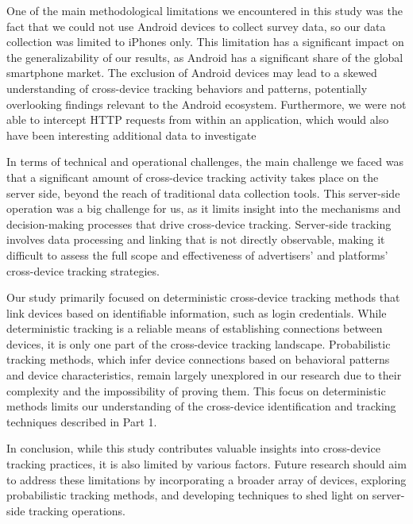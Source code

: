One of the main methodological limitations we encountered in this study was the fact that we could not use Android devices to collect survey data, so our data collection was limited to iPhones only. This limitation has a significant impact on the generalizability of our results, as Android has a significant share of the global smartphone market. The exclusion of Android devices may lead to a skewed understanding of cross-device tracking behaviors and patterns, potentially overlooking findings relevant to the Android ecosystem. Furthermore, we were not able to intercept HTTP requests from within an application, which would also have been interesting additional data to investigate

In terms of technical and operational challenges, the main challenge we faced was that a significant amount of cross-device tracking activity takes place on the server side, beyond the reach of traditional data collection tools. This server-side operation was a big challenge for us, as it limits insight into the mechanisms and decision-making processes that drive cross-device tracking. Server-side tracking involves data processing and linking that is not directly observable, making it difficult to assess the full scope and effectiveness of advertisers' and platforms' cross-device tracking strategies.

Our study primarily focused on deterministic cross-device tracking methods that link devices based on identifiable information, such as login credentials. While deterministic tracking is a reliable means of establishing connections between devices, it is only one part of the cross-device tracking landscape. Probabilistic tracking methods, which infer device connections based on behavioral patterns and device characteristics, remain largely unexplored in our research due to their complexity and the impossibility of proving them. This focus on deterministic methods limits our understanding of the cross-device identification and tracking techniques described in Part 1.

In conclusion, while this study contributes valuable insights into cross-device tracking practices, it is also limited by various factors. Future research should aim to address these limitations by incorporating a broader array of devices, exploring probabilistic tracking methods, and developing techniques to shed light on server-side tracking operations.